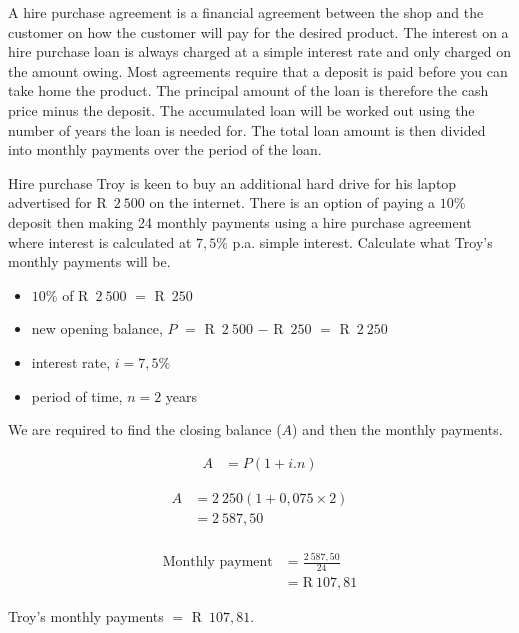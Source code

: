 A hire purchase agreement is a financial agreement between the shop and the customer on how the customer will pay for the desired product. The interest on a hire purchase loan is always charged at a simple interest rate and only charged on the amount owing. Most agreements require that a deposit is paid before you can take home the product. The principal amount of the loan is therefore the cash price minus the deposit. The accumulated loan will be worked out using the number of years the loan is needed for. The total loan amount is then divided into monthly payments over the period of the loan.


\begin{wex}{Hire purchase}{
    Troy is keen to buy an additional hard drive for his laptop advertised for R~$2~500$ on the internet. There is an option of paying a $10\%$ deposit then making 24 monthly payments using a hire purchase agreement where interest is calculated at $7,5\%$ p.a. simple interest. Calculate what Troy’s monthly payments will be.}{

    \begin{itemize}
	\item $10\%$ of R~$2~500$ $=$ R~$250$\\
	\item new opening balance, $P$ $=$ R~$2~500$ $−$ R~$250$ $=$ R~$2~250$\\
	\item interest rate, $i = 7,5\%$\\
	\item period of time, $n = 2$ years
    \end{itemize}

    We are required to find the closing balance ($A$) and then the monthly payments.

    \begin{align*}
	    A &= P(1 + i . n)
    \end{align*}

    \begin{align*}
	A &= 2~250(1 + 0,075 \times 2)\\
	  &= 2~587,50\\
    \end{align*}

    \begin{align*}
	\text{Monthly payment} &= \frac{2~587,50}{24}\\
			&= \text{R}~107,81
    \end{align*}

    Troy's monthly payments $=$ R~$107,81$.
}
\end{wex}


